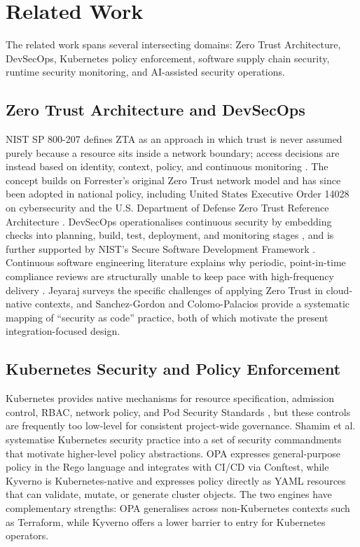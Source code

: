 \documentclass[conference]{IEEEtran}
\begin{document}
\section{Related Work}

The related work spans several intersecting domains: Zero Trust Architecture, DevSecOps, Kubernetes policy enforcement, software supply chain security, runtime security monitoring, and AI-assisted security operations.

\subsection{Zero Trust Architecture and DevSecOps}
NIST SP 800-207 defines ZTA as an approach in which trust is never assumed purely because a resource sits inside a network boundary; access decisions are instead based on identity, context, policy, and continuous monitoring \cite{rose2020}. The concept builds on Forrester's original Zero Trust network model \cite{kindervag2010} and has since been adopted in national policy, including United States Executive Order 14028 on cybersecurity \cite{biden2021} and the U.S. Department of Defense Zero Trust Reference Architecture \cite{disa2021}. DevSecOps operationalises continuous security by embedding checks into planning, build, test, deployment, and monitoring stages \cite{owasp2023,myrbakken2017}, and is further supported by NIST's Secure Software Development Framework \cite{souppaya2022}. Continuous software engineering literature explains why periodic, point-in-time compliance reviews are structurally unable to keep pace with high-frequency delivery \cite{fitzgerald2017}. Jeyaraj \cite{jeyaraj2023} surveys the specific challenges of applying Zero Trust in cloud-native contexts, and Sanchez-Gordon and Colomo-Palacios \cite{sanchez2020} provide a systematic mapping of ``security as code'' practice, both of which motivate the present integration-focused design.

\subsection{Kubernetes Security and Policy Enforcement}
Kubernetes provides native mechanisms for resource specification, admission control, RBAC, network policy, and Pod Security Standards \cite{kubernetes2024,cis2024}, but these controls are frequently too low-level for consistent project-wide governance. Shamim et al. \cite{shamim2020} systematise Kubernetes security practice into a set of security commandments that motivate higher-level policy abstractions. OPA \cite{opa2024} expresses general-purpose policy in the Rego language and integrates with CI/CD via Conftest, while Kyverno \cite{kyverno2024} is Kubernetes-native and expresses policy directly as YAML resources that can validate, mutate, or generate cluster objects. The two engines have complementary strengths: OPA generalises across non-Kubernetes contexts such as Terraform, while Kyverno offers a lower barrier to entry for Kubernetes operators.
\end{document}
